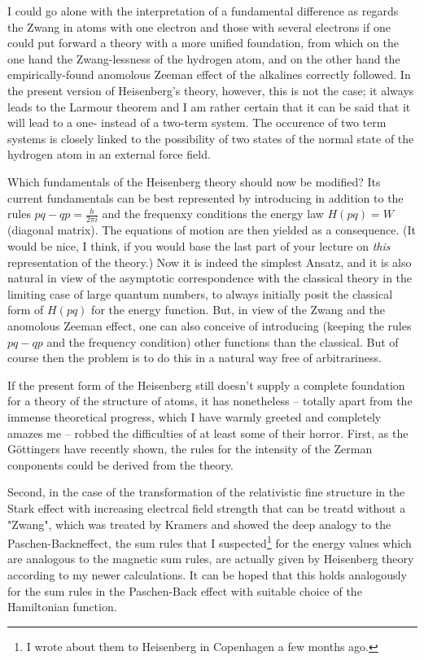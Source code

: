 I could go alone with the interpretation of a fundamental difference as regards the Zwang in atoms with one electron and those with several electrons if one could put forward a theory with a more unified foundation, from which on the one hand the Zwang-lessness of the hydrogen atom, and on the other hand the empirically-found anomolous Zeeman effect of the alkalines correctly followed. In the present version of Heisenberg's theory, however, this is not the case; it always leads to the Larmour theorem and I am rather certain that it can be said that it will lead to a one- instead of a two-term system. The occurence of two term systems is closely linked to the possibility of two states of the normal state of the hydrogen atom in an external force field.

Which fundamentals of the Heisenberg theory should now be modified? Its current fundamentals can be best represented by introducing in addition to the rules $pq-qp=\frac{h}{2\pi i}$ and the frequenxy conditions the energy law $H(pq) = W$ (diagonal matrix). The equations of motion are then yielded as a consequence. (It would be nice, I think, if you would base the last part of your lecture on \textit{this} representation of the theory.) Now it is indeed the simplest Ansatz, and it is also natural in view of the asymptotic correspondence with the classical theory in the limiting case of large quantum numbers, to always initially posit the classical form of $H(pq)$ for the energy function. But, in view of the Zwang and the anomolous Zeeman effect, one can also conceive of introducing (keeping the rules $pq-qp$ and the frequency condition) other functions than the classical. But of course then the problem is to do this in a natural way free of arbitrariness.

If the present form of the Heisenberg still doesn't supply a complete foundation for a theory of the structure of atoms, it has nonetheless -- totally apart from the immense theoretical progress, which I have warmly greeted and completely amazes me -- robbed the difficulties of at least some of their horror. First, as the G\"ottingers have recently shown, the rules for the intensity of the Zerman conponents could be derived from the theory.

Second, in the case of the transformation of the relativistic fine structure in the Stark effect with increasing electrcal field strength that can be treatd without a "Zwang", which was treated by Kramers and showed the deep analogy to the Paschen-Backneffect, the sum rules that I suspected\footnote{I wrote about them to Heisenberg in Copenhagen a few months ago.} for the energy values which are analogous to the magnetic sum rules, are actually given by Heisenberg theory according to my newer calculations. It can be hoped that this holds analogously for the sum rules in the Paschen-Back effect with suitable choice of the Hamiltonian function.

